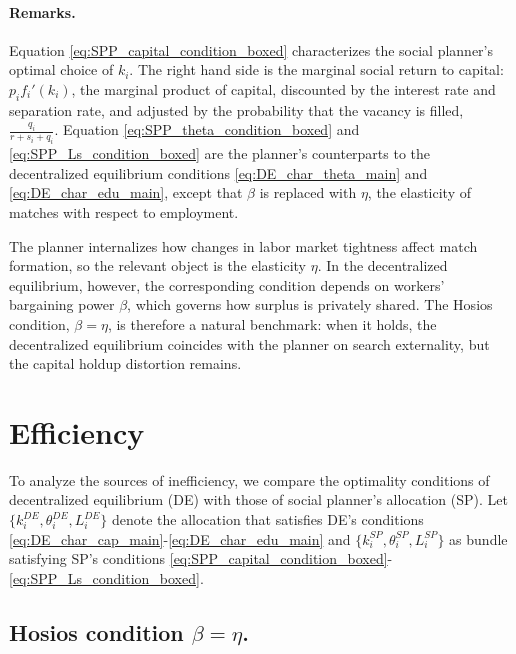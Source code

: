 \documentclass[12pt]{article} %
\theoremstyle{definition}
\begin{document}
\paragraph{Remarks.}  
Equation \eqref{eq:SPP_capital_condition_boxed} characterizes the social planner's optimal choice of $k_i$. The right hand side is the marginal social return to capital:  $p_if_i'(k_i)$, the marginal product of capital, discounted by the interest rate and separation rate, and adjusted by the probability that the vacancy is filled,  $\frac{q_i}{r+s_i+q_i}$. Equation \eqref{eq:SPP_theta_condition_boxed} and \eqref{eq:SPP_Ls_condition_boxed} are the planner's counterparts to the decentralized equilibrium conditions \eqref{eq:DE_char_theta_main} and \eqref{eq:DE_char_edu_main}, except that $\beta$ is replaced with $\eta$,   the elasticity of matches with respect to employment. 

The planner internalizes how changes in labor market tightness affect match formation, so the relevant object is the elasticity $\eta$.  In the decentralized equilibrium, however, the corresponding  condition depends on workers' bargaining power $\beta$, which governs how surplus is privately shared. The Hosios condition, $\beta=\eta$, is therefore a natural benchmark: when it holds, the decentralized equilibrium coincides with the planner on search externality, but the capital holdup distortion remains. 


\section{Efficiency}
\label{sec:ineff_general}

To analyze the sources of inefficiency, we compare the optimality conditions of decentralized equilibrium (DE)  with those of social planner's allocation (SP). Let $\{k_i^{DE}, \theta_i^{DE}, L_i^{DE} \}$ denote the allocation that satisfies DE's conditions \eqref{eq:DE_char_cap_main}-\eqref{eq:DE_char_edu_main}  and 
 $\{k_i^{SP}, \theta_i^{SP}, L_i^{SP} \}$ as bundle satisfying SP's conditions \eqref{eq:SPP_capital_condition_boxed}-\eqref{eq:SPP_Ls_condition_boxed}.


\subsection{Hosios condition $\beta=\eta$.}
\end{document}
